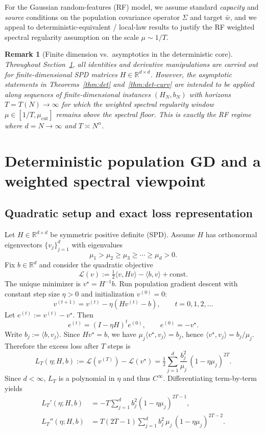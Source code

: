 \documentclass[11pt]{article}
\newtheorem{remark}{Remark}
\begin{document}
For the Gaussian random-features (RF) model, we assume standard \emph{capacity} and
\emph{source} conditions on the population covariance operator $\Sigma$ and target
$\bar w$, and we appeal to deterministic-equivalent / local-law results to justify the
RF weighted spectral regularity assumption on the scale $\mu\sim 1/T$.

\begin{remark}[Finite dimension vs.\ asymptotics in the deterministic core]
Throughout Section~\ref{sec:det}, all identities and derivative manipulations are
carried out for finite-dimensional SPD matrices $H\in\mathbb R^{d\times d}$. However,
the asymptotic statements in Theorems~\ref{thm:det} and~\ref{thm:det-curv} are intended
to be applied along sequences of finite-dimensional instances $(H_N,b_N)$ with horizons
$T=T(N)\to\infty$ for which the weighted spectral regularity window
$\mu\in[1/T,\mu_{\mathrm{cut}}]$ remains above the spectral floor.
This is exactly the RF regime where $d=N\to\infty$ and $T\asymp N^\alpha$.
\end{remark}

\section{Deterministic population GD and a weighted spectral viewpoint}
\label{sec:det}

\subsection{Quadratic setup and exact loss representation}

Let $H\in\mathbb R^{d\times d}$ be symmetric positive definite (SPD). Assume $H$ has
orthonormal eigenvectors $\{v_j\}_{j=1}^d$ with eigenvalues
\[
\mu_1>\mu_2\ge \mu_3\ge \cdots \ge \mu_d>0.
\]
Fix $b\in\mathbb R^d$ and consider the quadratic objective
\[
\mathcal L(v):=\tfrac12\langle v,Hv\rangle-\langle b,v\rangle+\mathrm{const}.
\]
The unique minimizer is $v^\star=H^{-1}b$. Run population gradient descent with
constant step size $\eta>0$ and initialization $v^{(0)}=0$:
\[
v^{(t+1)}=v^{(t)}-\eta(Hv^{(t)}-b),\qquad t=0,1,2,\dots
\]
Let $e^{(t)}:=v^{(t)}-v^\star$. Then
\[
e^{(t)}=(I-\eta H)^t e^{(0)},\qquad e^{(0)}=-v^\star.
\]
Write $b_j:=\langle b,v_j\rangle$. Since $Hv^\star=b$, we have
$\mu_j\langle v^\star,v_j\rangle=b_j$, hence $\langle v^\star,v_j\rangle=b_j/\mu_j$.
Therefore the excess loss after $T$ steps is
\begin{equation}\label{eq:LT}
L_T(\eta;H,b):=\mathcal L(v^{(T)})-\mathcal L(v^\star)
=\tfrac12\sum_{j=1}^d\frac{b_j^2}{\mu_j}\,(1-\eta\mu_j)^{2T}.
\end{equation}
Since $d<\infty$, $L_T$ is a polynomial in $\eta$ and thus $C^\infty$. Differentiating
term-by-term yields
\begin{align}
L_T'(\eta;H,b)
&=-T\sum_{j=1}^d b_j^2(1-\eta\mu_j)^{2T-1},
\label{eq:LTprime}\\
L_T''(\eta;H,b)
&=
T(2T-1)\sum_{j=1}^d b_j^2\,\mu_j\,(1-\eta\mu_j)^{2T-2}.
\label{eq:LTsecond}
\end{align}
\end{document}
